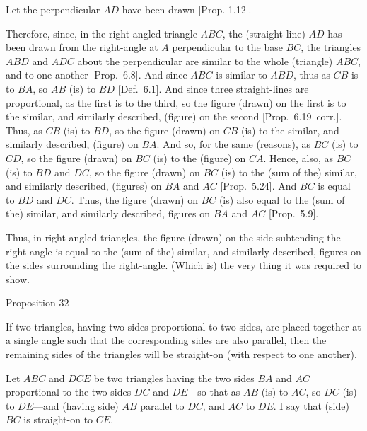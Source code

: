 Let the perpendicular $AD$ have been drawn  [Prop. 1.12].

Therefore, since, in the right-angled triangle  $ABC$, the (straight-line) $AD$ has been drawn from the right-angle
at $A$ perpendicular to the base $BC$, the triangles $ABD$
and $ADC$ about the perpendicular are similar to the whole (triangle) $ABC$,
and to one another  [Prop.~6.8].
And since $ABC$ is similar to $ABD$, thus as $CB$ is to $BA$, so $AB$ (is) to
$BD$ [Def.~6.1]. And since three straight-lines
are proportional, as the first is to the third, so the figure (drawn) on the
first is to the similar, and similarly described, (figure) on the second 
[Prop.~6.19~corr.]. Thus, as $CB$ (is) to
$BD$, so the figure (drawn) on $CB$ (is) to the similar, and similarly
described, (figure) on $BA$. And so, for the same (reasons), as $BC$ (is) to
$CD$, so the figure  (drawn) on $BC$ (is) to the (figure) on $CA$. Hence,
also, as $BC$ (is) to $BD$ and $DC$, so the figure (drawn) on $BC$ (is) to
the (sum of the) similar, and similarly described, (figures) on $BA$ and $AC$ [Prop.~5.24].
And $BC$ is equal to $BD$ and $DC$. Thus, the figure (drawn) on $BC$
(is) also equal to the (sum of the) similar, and similarly described, figures
on $BA$ and $AC$ [Prop.~5.9].

Thus, in right-angled triangles, the figure (drawn)
on the side subtending the right-angle is equal to the (sum of the) similar, and similarly
described, figures on the sides surrounding the right-angle. (Which is)
the very thing it was required to show.


\begin{center}
{\large Proposition 32}
\end{center}

If two triangles,
having two sides proportional to two sides, are placed together at a single angle such that the corresponding 
sides are also parallel, then the remaining sides of the triangles will
be straight-on (with respect to one another).

\epsfysize=2in
\centerline{}

Let $ABC$ and $DCE$ be two triangles having the two sides $BA$ and $AC$
proportional to the two sides $DC$ and $DE$---so that as $AB$ (is) to $AC$, so
$DC$ (is) to $DE$---and (having side) $AB$ parallel to $DC$, and $AC$ to $DE$. I say that (side) $BC$
is straight-on to $CE$.

